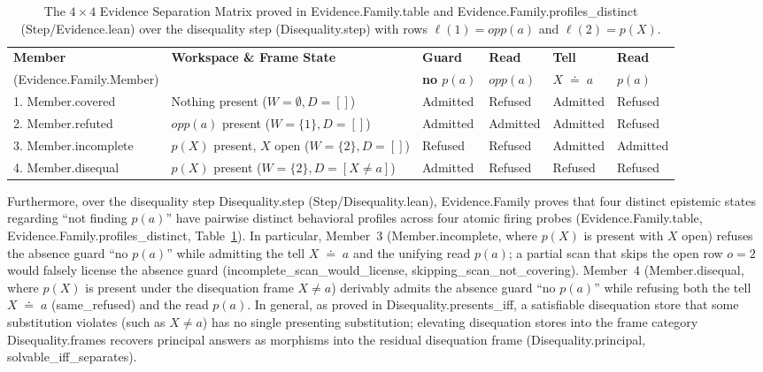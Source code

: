 \documentclass[11pt,a4paper]{article}
\theoremstyle{definition}
\DeclareRobustCommand{\lean}[1]{%
  \ifmmode\text{\normalfont\ttfamily\footnotesize\detokenize{#1}}%
  \else{\normalfont\footnotesize\leanurl{#1}}\fi}
\DeclareRobustCommand{\metta}[1]{\text{\normalfont\ttfamily\footnotesize #1}}
\def\lean#1{#1}%
\def\metta#1{#1}%
\newcommand{\doteqStore}{\;\doteq\;}
\begin{document}
\begin{table}[t]
\centering
\caption{The $4 \times 4$ Evidence Separation Matrix proved in \lean{Evidence.Family.table} and \lean{Evidence.Family.profiles_distinct} (\lean{Step/Evidence.lean}) over the disequality step (\lean{Disequality.step}) with rows $\ell(1) = \metta{opp(a)}$ and $\ell(2) = \metta{p(X)}$.}
\label{tab:evidence-matrix}
\footnotesize
\setlength{\tabcolsep}{3.5pt}
\renewcommand{\arraystretch}{1.18}
\begin{tabular}{@{}p{3.0cm}p{4.3cm}llll@{}}
\toprule
\textbf{Member} & \textbf{Workspace \& Frame State} & \textbf{Guard} & \textbf{Read} & \textbf{Tell} & \textbf{Read} \\
(\lean{Evidence.Family.Member}) & & \textbf{no $\metta{p(a)}$} & \textbf{$\metta{opp(a)}$} & \textbf{$X \doteqStore \metta{a}$} & \textbf{$\metta{p(a)}$} \\
\midrule
1. \lean{Member.covered} & Nothing present ($W = \emptyset, D = []$) & Admitted & Refused & Admitted & Refused \\
2. \lean{Member.refuted} & $\metta{opp(a)}$ present ($W = \{1\}, D = []$) & Admitted & Admitted & Admitted & Refused \\
3. \lean{Member.incomplete} & $\metta{p(X)}$ present, $X$ open ($W = \{2\}, D = []$) & Refused & Refused & Admitted & Admitted \\
4. \lean{Member.disequal} & $\metta{p(X)}$ present ($W = \{2\}, D = [X \neq \metta{a}]$) & Admitted & Refused & Refused & Refused \\
\bottomrule
\end{tabular}
\end{table}

Furthermore, over the disequality step \lean{Disequality.step} (\lean{Step/Disequality.lean}), \lean{Evidence.Family} proves that four distinct epistemic states regarding ``not finding $\metta{p(a)}$'' have pairwise distinct behavioral profiles across four atomic firing probes (\lean{Evidence.Family.table}, \lean{Evidence.Family.profiles_distinct}, Table~\ref{tab:evidence-matrix}). In particular, Member~3 (\lean{Member.incomplete}, where $\metta{p(X)}$ is present with $X$ open) refuses the absence guard ``no $\metta{p(a)}$'' while admitting the tell $X \doteqStore \metta{a}$ and the unifying read $\metta{p(a)}$; a partial scan that skips the open row $o = 2$ would falsely license the absence guard (\lean{incomplete_scan_would_license}, \lean{skipping_scan_not_covering}). Member~4 (\lean{Member.disequal}, where $\metta{p(X)}$ is present under the disequation frame $X \neq \metta{a}$) derivably admits the absence guard ``no $\metta{p(a)}$'' while refusing both the tell $X \doteqStore \metta{a}$ (\lean{same_refused}) and the read $\metta{p(a)}$. In general, as proved in \lean{Disequality.presents_iff}, a satisfiable disequation store that some substitution violates (such as $X \neq \metta{a}$) has no single presenting substitution; elevating disequation stores into the frame category \lean{Disequality.frames} recovers principal answers as morphisms into the residual disequation frame (\lean{Disequality.principal}, \lean{solvable_iff_separates}).
\end{document}
